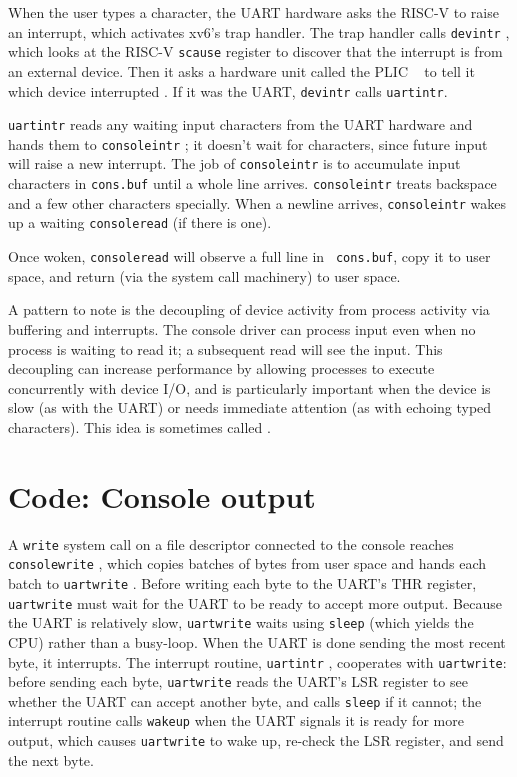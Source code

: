 When the user types a character, the UART hardware asks the RISC-V
to raise an interrupt, which activates
xv6's trap handler.
The trap handler calls {\tt devintr}
,
which looks at the RISC-V {\tt scause} register to discover that
the interrupt is from an external device.
Then it asks a hardware unit called the PLIC
~\cite{riscv:priv}
to tell it which device interrupted
.
If it was the UART, {\tt devintr} calls {\tt uartintr}.

{\tt uartintr}
reads any waiting input characters from the UART hardware
and hands them to {\tt consoleintr}
; it doesn't
wait for characters, since future input will raise a new interrupt.
The job of {\tt consoleintr} is to accumulate input characters in
{\tt cons.buf} 
until a whole line arrives.
{\tt consoleintr} treats backspace and a few other characters
specially.
When a newline arrives, {\tt consoleintr} wakes up a
waiting {\tt consoleread} (if there is one).

Once woken, {\tt consoleread} will observe a full line in {\tt
  cons.buf}, copy it to user space, and return (via the system call
machinery) to user space.

A pattern to note is the decoupling of device activity from process
activity via buffering and interrupts. The console driver can process
input even when no process is waiting to read it; a subsequent read
will see the input. This decoupling can increase performance by
allowing processes to execute concurrently with device I/O, and is
particularly important when the device is slow (as with the UART) or
needs immediate attention (as with echoing typed characters). This
idea is sometimes called .

\section{Code: Console output}

A {\tt write} system call on a file descriptor connected to the console
reaches
{\tt consolewrite}
,
which copies batches of bytes from user space
and hands each batch to {\tt uartwrite}
.
Before writing each byte to the UART's THR register,
{\tt uartwrite} must wait for the UART to be ready
to accept more output. Because the UART is relatively
slow, {\tt uartwrite} waits using {\tt sleep}
(which yields the CPU)
rather than a busy-loop.
When the UART is done sending the most recent byte,
it interrupts. The interrupt routine,
{\tt uartintr}
,
cooperates with {\tt uartwrite}:
before sending each byte, {\tt uartwrite} reads the UART's
LSR register to see whether the UART can accept another byte,
and calls {\tt sleep} if it cannot;
the interrupt routine calls {\tt wakeup} when the UART signals
it is ready for more output, which causes {\tt uartwrite}
to wake up, re-check the LSR register, and send the next byte.

